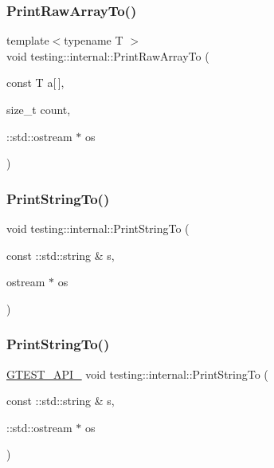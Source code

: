 \mbox{\label{namespacetesting_1_1internal_ad3013b6b4c825edee9fe18ff1d982faa}} 
\subsubsection{\texorpdfstring{PrintRawArrayTo()}{PrintRawArrayTo()}}
{\footnotesize\ttfamily template$<$typename T $>$ \\
void testing\+::internal\+::\+Print\+Raw\+Array\+To (\begin{DoxyParamCaption}\item[{const T}]{a\mbox{[}$\,$\mbox{]},  }\item[{size\+\_\+t}]{count,  }\item[{\+::std\+::ostream $\ast$}]{os }\end{DoxyParamCaption})}

\mbox{\label{namespacetesting_1_1internal_ad609167d8d6792b0fb186539e0e159bd}} 
\subsubsection{\texorpdfstring{PrintStringTo()}{PrintStringTo()}\hspace{0.1cm}{\footnotesize\ttfamily [1/2]}}
{\footnotesize\ttfamily void testing\+::internal\+::\+Print\+String\+To (\begin{DoxyParamCaption}\item[{const \+::std\+::string \&}]{s,  }\item[{ostream $\ast$}]{os }\end{DoxyParamCaption})}

\mbox{\label{namespacetesting_1_1internal_a8b53e46cea3f8bdfc9342057c4f6ba62}} 
\subsubsection{\texorpdfstring{PrintStringTo()}{PrintStringTo()}\hspace{0.1cm}{\footnotesize\ttfamily [2/2]}}
{\footnotesize\ttfamily \mbox{\hyperlink{_obj__test_2lib_2googletest-release-1_88_81_2googletest_2include_2gtest_2internal_2gtest-port_8h_aa73be6f0ba4a7456180a94904ce17790}{G\+T\+E\+S\+T\+\_\+\+A\+P\+I\+\_\+}} void testing\+::internal\+::\+Print\+String\+To (\begin{DoxyParamCaption}\item[{const \+::std\+::string \&}]{s,  }\item[{\+::std\+::ostream $\ast$}]{os }\end{DoxyParamCaption})}

